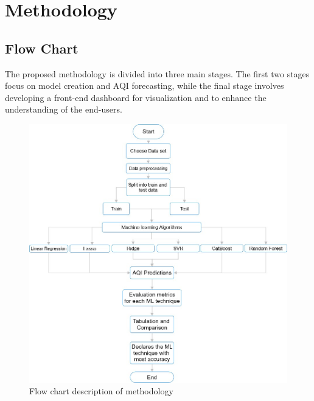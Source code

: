 \documentclass{book}
\numberwithin{equation}{section}
\numberwithin{figure}{section}
\begin{document}
\chapter{Methodology}
\label{ch3}
\section{Flow Chart}
\label{flow}
\vspace{-5mm} %
The proposed methodology is divided into three main stages. The first two stages focus on model creation and AQI forecasting, while the final stage involves developing a front-end dashboard for visualization and to enhance the understanding of the end-users.
\begin{figure}[ht]
    \centering
    \includegraphics[width=0.8\linewidth]{flowchart.jpg}
    \caption{ Flow chart description of methodology}
    \label{fig:flowchart}
\end{figure}
\end{document}
